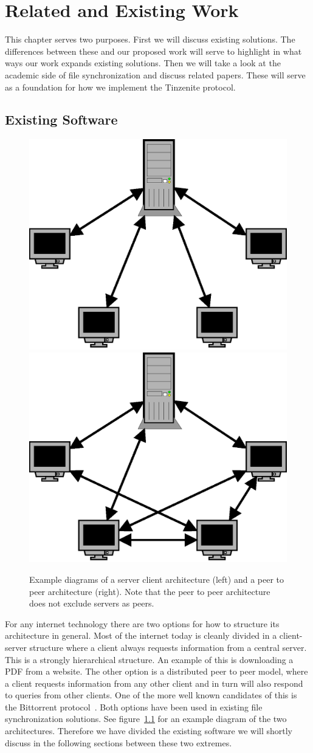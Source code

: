 \chapter{Related and Existing Work}
\label{chap:Related and Existing Work}

This chapter serves two purposes.
First we will discuss existing solutions.
The differences between these and our proposed work will serve to highlight in what ways our work expands existing solutions.
Then we will take a look at the academic side of file synchronization and discuss related papers.
These will serve as a foundation for how we implement the Tinzenite protocol.

\section{Existing Software}
\label{sec:Existing Software}

\begin{figure}[htp]
\centering
    \includegraphics[width=0.3\linewidth]{diagram/topo_s2c}
    \hspace{2em}
    \includegraphics[width=0.3\linewidth]{diagram/topo_p2p}
\caption[Example Network Structures]{Example diagrams of a server client architecture (left) and a peer to peer architecture (right). Note that the peer to peer architecture does not exclude servers as peers.}
\label{fig:example_netarch}
\end{figure}

For any internet technology there are two options for how to structure its architecture in general.
Most of the internet today is cleanly divided in a client-server structure where a client always requests information from a central server.
This is a strongly hierarchical structure.
An example of this is downloading a PDF from a website.
The other option is a distributed peer to peer model, where a client requests information from any other client and in turn will also respond to queries from other clients.
One of the more well known candidates of this is the Bittorrent protocol~\cite{web:site:bittorrent}.
Both options have been used in existing file synchronization solutions.
See figure~\ref{fig:example_netarch} for an example diagram of the two architectures.
Therefore we have divided the existing software we will shortly discuss in the following sections between these two extremes.

